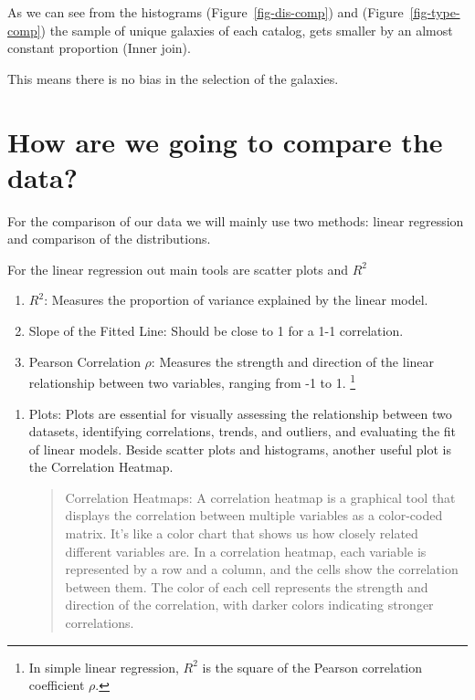 \documentclass[
]{article}
\begin{document}
As we can see from the histograms (Figure~\ref{fig-dis-comp}) and
(Figure~\ref{fig-type-comp}) the sample of unique galaxies of each
catalog, gets smaller by an almost constant proportion (Inner join).

This means there is no bias in the selection of the galaxies.

\section{How are we going to compare the
data?}\label{how-are-we-going-to-compare-the-data}

For the comparison of our data we will mainly use two methods: linear
regression and comparison of the distributions.

For the linear regression out main tools are scatter plots and \(R^2\)

\begin{enumerate}
\def\labelenumi{\arabic{enumi}.}
\item
  \(R^2\): Measures the proportion of variance explained by the linear
  model.
\item
  Slope of the Fitted Line: Should be close to 1 for a 1-1 correlation.
\item
  Pearson Correlation \(\rho\): Measures the strength and direction of
  the linear relationship between two variables, ranging from -1 to 1.
  \footnote{In simple linear regression, \(R^2\) is the square of the
    Pearson correlation coefficient \(\rho\).}
\end{enumerate}

\begin{enumerate}
\def\labelenumi{\arabic{enumi}.}
\setcounter{enumi}{3}
\item
  Plots: Plots are essential for visually assessing the relationship
  between two datasets, identifying correlations, trends, and outliers,
  and evaluating the fit of linear models. Beside scatter plots and
  histograms, another useful plot is the Correlation Heatmap.

  \begin{quote}
  Correlation Heatmaps: A correlation heatmap is a graphical tool that
  displays the correlation between multiple variables as a color-coded
  matrix. It's like a color chart that shows us how closely related
  different variables are. In a correlation heatmap, each variable is
  represented by a row and a column, and the cells show the correlation
  between them. The color of each cell represents the strength and
  direction of the correlation, with darker colors indicating stronger
  correlations.
  \end{quote}
\end{enumerate}
\end{document}
